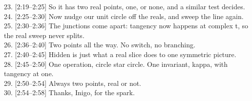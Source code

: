 \documentclass[10pt]{article}
\begin{document}
23. [2:19--2:25] So it has two real points, one, or none, and a similar test decides.\\
24. [2:25--2:30] Now nudge our unit circle off the reals, and sweep the line again.\\
25. [2:30--2:36] The junctions come apart: tangency now happens at complex t, so the real sweep never splits.\\
26. [2:36--2:40] Two points all the way. No switch, no branching.\\
27. [2:40--2:45] Hidden is just what a real slice does to one symmetric picture.\\
28. [2:45--2:50] One operation, circle star circle. One invariant, kappa, with tangency at one.\\
29. [2:50--2:54] Always two points, real or not.\\
30. [2:54--2:58] Thanks, Inigo, for the spark.
\end{document}
